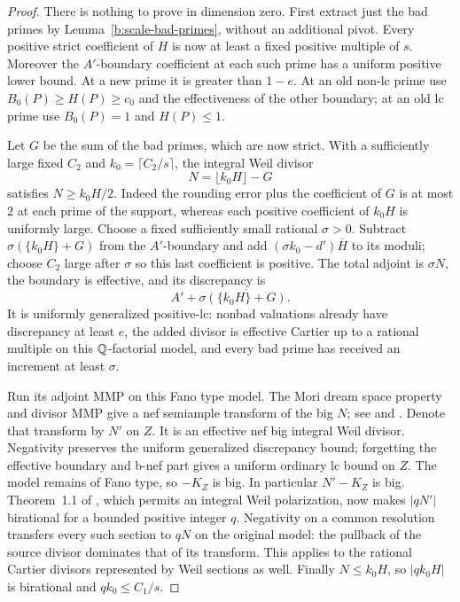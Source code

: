 \begin{proof}
There is nothing to prove in dimension zero.  First extract just the
bad primes by Lemma~\ref{b:scale-bad-primes}, without an additional
pivot.  Every positive strict coefficient of $H$ is now at least a
fixed positive multiple of $s$.  Moreover the $A'$-boundary coefficient
at each such prime has a uniform positive lower bound.  At a new prime
it is greater than $1-e$.  At an old non-lc prime use
$B_0(P)\ge H(P)\ge c_0$ and the effectiveness of the other boundary;
at an old lc prime use $B_0(P)=1$ and $H(P)\le1$.

Let $G$ be the sum of the bad primes, which are now strict.  With a
sufficiently large fixed $C_2$ and $k_0=\lceil C_2/s\rceil$, the integral
Weil divisor
\[
                  N=\lfloor k_0H\rfloor-G
\]
satisfies $N\ge k_0H/2$.  Indeed the rounding error plus the coefficient
of $G$ is at most $2$ at each prime of the support, whereas each
positive coefficient of $k_0H$ is uniformly large.
Choose a fixed sufficiently small rational $\sigma>0$.  Subtract
$\sigma(\{k_0H\}+G)$ from the $A'$-boundary and add
$(\sigma k_0-d')\overline H$ to its moduli; choose $C_2$ large after
$\sigma$ so this last coefficient is positive.  The total adjoint is
$\sigma N$, the boundary is effective, and its discrepancy is
\[
             A'+\sigma\overline{(\{k_0H\}+G)}.
\]
It is uniformly generalized positive-lc: nonbad valuations already
have discrepancy at least $e$, the added divisor is effective Cartier
up to a rational multiple on this $\mathbb Q$-factorial model, and every bad
prime has received an increment at least $\sigma$.

Run its adjoint MMP on this Fano type model.  The Mori dream space
property and divisor MMP give a nef semiample transform of the big
$N$; see \cite[Corollary~1.3.1]{BCHM} and
\cite[Proposition~1.11]{HuKeel}.  Denote that transform by $N'$ on $Z$.
It is an effective nef big integral Weil divisor.  Negativity preserves
the uniform generalized discrepancy bound; forgetting the effective
boundary and b-nef part gives a uniform ordinary lc bound on $Z$.
The model remains of Fano type, so $-K_Z$ is big.  In particular
$N'-K_Z$ is big.  Theorem~1.1 of \cite{BirkarPolarised}, which permits
an integral Weil polarization, now makes $|qN'|$ birational for a
bounded positive integer $q$.  Negativity on a common resolution
transfers every such section to $qN$ on the original model: the
pullback of the source divisor dominates that of its transform.
This applies to the rational Cartier divisors represented by Weil
sections as well.  Finally $N\le k_0H$, so $|qk_0H|$ is birational and
$qk_0\le C_1/s$.


\end{proof}
